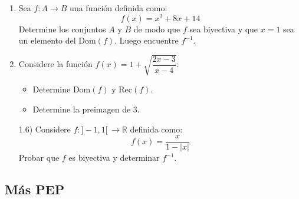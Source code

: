 \documentclass[letterpaper, 12pt]{article}
\begin{document}
\begin{enumerate}
    \item[\textbf{1.4)}] Sea $f:A\rightarrow B$ una función definida como:
    \[
    f(x) = x^{2}+8x+14
    \]
    Determine los conjuntos $A$ y $B$ de modo que $f$ sea biyectiva y que $x=1$ sea un elemento del $\text{Dom}(f)$. Luego encuentre $f^{-1}$.

    \item[\textbf{1.5)}] Considere la función $f(x)=1+\sqrt{\dfrac{2x-3}{x-4}}$:
    \begin{itemize}
        \item[\textbf{a)}] Determine $\text{Dom}(f)$ y $\text{Rec}(f)$.
        \item[\textbf{b)}] Determine la preimagen de $3$.
    \end{itemize}
1.6) Considere $f:]-1,1[\,\rightarrow\mathbb{R}$ definida como:
    \[
    f(x) = \frac{x}{1-|x|}
    \]
    Probar que $f$ es biyectiva y determinar $f^{-1}$.
\end{enumerate}
\newpage
\subsection*{ Más PEP}
\end{document}

